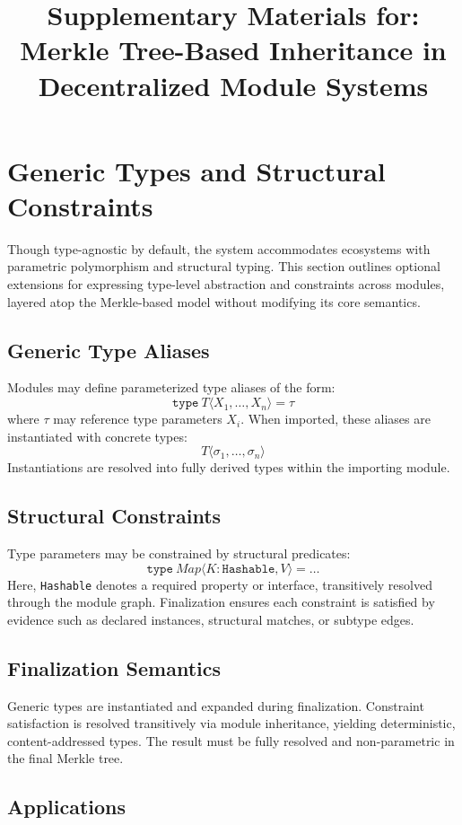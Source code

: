 \documentclass[sigplan,screen]{acmart}
\title{Supplementary Materials for: Merkle Tree-Based Inheritance in Decentralized Module Systems}
\begin{document}
\appendix

\section{Generic Types and Structural Constraints}
\label{appendix:generics}

Though type-agnostic by default, the system accommodates ecosystems with parametric polymorphism and structural typing. This section outlines optional extensions for expressing type-level abstraction and constraints across modules, layered atop the Merkle-based model without modifying its core semantics.

\subsection{Generic Type Aliases}

Modules may define parameterized type aliases of the form:
\[
\texttt{type}~T\langle X_1, \ldots, X_n \rangle = \tau
\]
where $\tau$ may reference type parameters $X_i$. When imported, these aliases are instantiated with concrete types:
\[
T\langle \sigma_1, \ldots, \sigma_n \rangle
\]
Instantiations are resolved into fully derived types within the importing module.

\subsection{Structural Constraints}

Type parameters may be constrained by structural predicates:
\[
\texttt{type}~Map\langle K: \texttt{Hashable}, V \rangle = \ldots
\]
Here, \texttt{Hashable} denotes a required property or interface, transitively resolved through the module graph. Finalization ensures each constraint is satisfied by evidence such as declared instances, structural matches, or subtype edges.

\subsection{Finalization Semantics}

Generic types are instantiated and expanded during finalization. Constraint satisfaction is resolved transitively via module inheritance, yielding deterministic, content-addressed types. The result must be fully resolved and non-parametric in the final Merkle tree.

\subsection{Applications}
\end{document}
